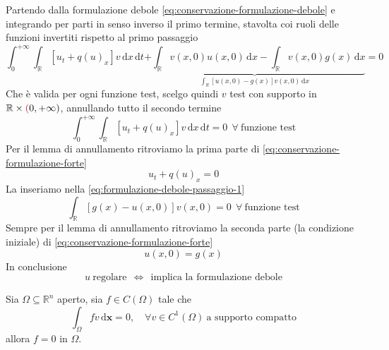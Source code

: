 \documentclass[10pt,a4paper,twoside,openright]{book}
\newcommand{\x}{\mathbf{x}}
\newcommand{\de}{\,\mathrm d}
\newcommand{\dx}{\de x}
\newcommand{\dt}{\de t}
\newcommand{\dxx}{\de \x}
\begin{document}
Partendo dalla formulazione debole \eqref{eq:conservazione-formulazione-debole} e integrando per parti in senso inverso il primo termine, stavolta coi ruoli delle funzioni invertiti rispetto al primo passaggio
\begin{equation}
	\int ^{+\infty }_{0}\int _{\mathbb{R}}[ u_{t}+q(u)_{x}] v\dx\dt\underbrace{+\int _{\mathbb{R}} v(x,0) u(x,0) \dx-\int _{\mathbb{R}} v(x,0) g(x) \dx}_{\int _{\mathbb{R}}[ u(x,0)-g(x)] v(x,0) \dx} =0
	\label{eq:formulazione-debole-passaggio-1}
\end{equation}
Che è valida per ogni funzione test, scelgo quindi $v$ test con supporto in $\mathbb{R} \times \textcolor[rgb]{0.82,0.01,0.11}{(} 0,+\infty)$, annullando tutto il secondo termine
\begin{equation*}
	\int ^{+\infty }_{0}\int _{\mathbb{R}}[ u_{t} +q(u)_{x}] v\dx\dt=0\ \ \forall \ \text{funzione test}
\end{equation*}
Per il lemma di annullamento ritroviamo la prima parte di \eqref{eq:conservazione-formulazione-forte}
\begin{equation*}
	u_{t} +q(u)_{x} =0
\end{equation*}
La inseriamo nella \eqref{eq:formulazione-debole-passaggio-1}
\begin{equation*}
	\int _{\mathbb{R}}[ g(x) -u(x,0)] v(x,0) =0\ \ \forall \ \text{funzione test}
\end{equation*}
Sempre per il lemma di annullamento ritroviamo la seconda parte (la condizione iniziale) di \eqref{eq:conservazione-formulazione-forte}
\begin{equation*}
	u(x,0) =g(x)
\end{equation*}
In conclusione
\begin{equation}
	u\ \text{regolare} \ \ \Leftrightarrow \ \ \text{implica la formulazione debole}
\end{equation}
\begin{theorem}
	 Sia $\Omega \subseteq \mathbb{R}^{n}$ aperto, sia $f\in C(\Omega)$ tale che
	\begin{equation}
		\int _{\Omega } fv\dxx=0, \quad \forall  v\in C^{1}(\Omega) \ \text{a supporto compatto}
	\end{equation}
	allora $f=0$ in $\Omega $.
\end{theorem}
\end{document}
